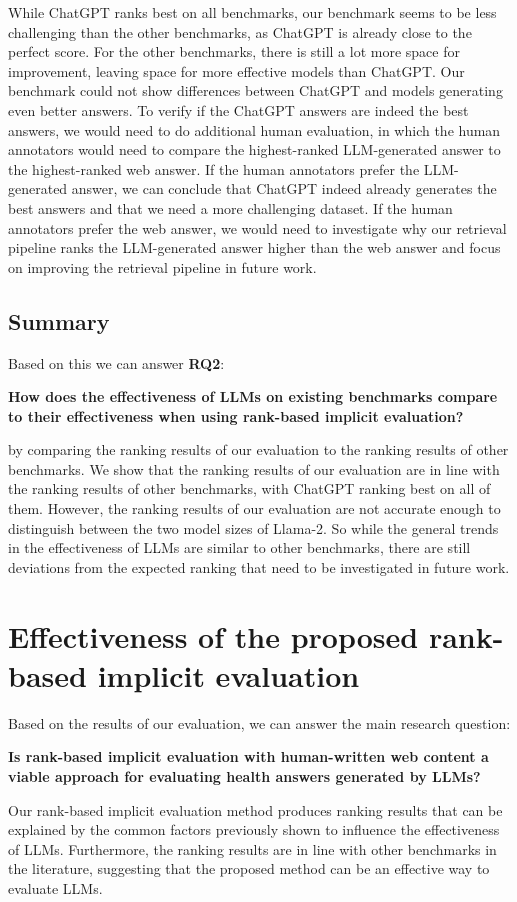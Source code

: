 While ChatGPT ranks best on all benchmarks, our benchmark seems to be less challenging than the other benchmarks, as ChatGPT is already close to the perfect score.
For the other benchmarks, there is still a lot more space for improvement, leaving space for more effective models than ChatGPT.
Our benchmark could not show differences between ChatGPT and models generating even better answers.
To verify if the ChatGPT answers are indeed the best answers, we would need to do additional human evaluation, in which the human annotators would need to compare the highest-ranked LLM-generated answer to the highest-ranked web answer.
If the human annotators prefer the LLM-generated answer, we can conclude that ChatGPT indeed already generates the best answers and that we need a more challenging dataset.
If the human annotators prefer the web answer, we would need to investigate why our retrieval pipeline ranks the LLM-generated answer higher than the web answer and focus on improving the retrieval pipeline in future work.

\subsection{Summary}
Based on this we can answer \textbf{RQ2}:
\begin{center}
    \textbf{How does the effectiveness of LLMs on existing benchmarks compare to their effectiveness when using rank-based implicit evaluation?}
\end{center}
by comparing the ranking results of our evaluation to the ranking results of other benchmarks.
We show that the ranking results of our evaluation are in line with the ranking results of other benchmarks, with ChatGPT ranking best on all of them.
However, the ranking results of our evaluation are not accurate enough to distinguish between the two model sizes of Llama-2.
So while the general trends in the effectiveness of LLMs are similar to other benchmarks, there are still deviations from the expected ranking that need to be investigated in future work.

\section{Effectiveness of the proposed rank-based implicit evaluation}
Based on the results of our evaluation, we can answer the main research question:
\begin{center}
    \textbf{Is rank-based implicit evaluation with human-written web content a viable approach for evaluating health answers generated by LLMs?}
\end{center}
Our rank-based implicit evaluation method produces ranking results that can be explained by the common factors previously shown to influence the effectiveness of LLMs.
Furthermore, the ranking results are in line with other benchmarks in the literature, suggesting that the proposed method can be an effective way to evaluate LLMs.

